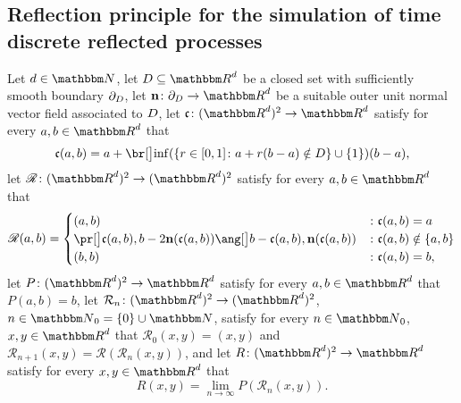 \subsection{Reflection principle for the simulation of time discrete reflected processes}
\label{subsec:temp-discret}
\begin{algo}
	\label{algo:time_discrete_reflected_processes}
	Let
		$d \in \N$, %
	let
		$\D \subseteq \R^{ d }$
		be a closed set with sufficiently smooth boundary	$\partial_D$,
	let
		$ \mathbf{n} \colon \partial_\D \to \R^d $ 
		be a suitable outer unit normal vector field associated to $D$,
	let 
		$\mathfrak{c} \colon (\R^d)^2  \to \R^d $ 
	satisfy 
		for every
			$a,b \in \R^d$
		that
		\begin{equation}
			\mathfrak{c}(a,b) 
			=
			a + \bbr{\inf( \{r \in [0,1] \colon a + r(b - a) \notin \D\}\cup \{1\})} (b-a)
			,
		\end{equation}
	let
		$\mathscr{R} \colon (\R^{ d })^2 \to ( \R^{ d })^2 $
	satisfy 
		for every
			$a,b \in \R^d$
		that
		\begin{equation}
			\mathscr{R}(a,b) 
			= 
			\begin{cases}
				(a,b)
				& \colon \mathfrak{c}(a,b) =a \\
				\bpr{ \mathfrak{c}(a,b), b - 2\mathbf{n}(\mathfrak{c}(a,b)) \bang{ b-\mathfrak{c}(a,b),\mathbf{n}(\mathfrak{c}(a,b))} }
				& \colon \mathfrak{c}(a,b) \notin\{a, b\} \\
				(b,b) 
				& \colon \mathfrak{c}(a,b) = b,
			\end{cases}
		\end{equation}
	let
		$P \colon (\R^d)^2 \to \R^d$
	satisfy 
		for every
			$a,b \in \R^d$
		that
			$P(a,b) = b$,
	let
		$\mathcal{R}_{n} \colon (\R^d)^2 \to ( \R^{ d } )^2$, $n \in \N_0 = \{0\} \cup \N$,
	satisfy 
		for every
			$n \in \N_0 $,
			$x,y \in \R^d$
		that
			$\mathcal{R}_0(x,y) = (x,y)$ and
			$\mathcal{R}_{ n + 1 }(x,y) = \mathscr{R}( \mathcal{R}_{n} (x,y ) ) $,
	and let
		$R \colon (\R^d)^2 \to \R^d $
	satisfy 
		for every
			$x,y\in \R^d$
		that
		\begin{equation}
			R(x,y)
			=
			{\textstyle \lim_{n\to \infty}} P(\mathcal{R}_{n}(x,y))
			.
		\end{equation}
\end{algo}

